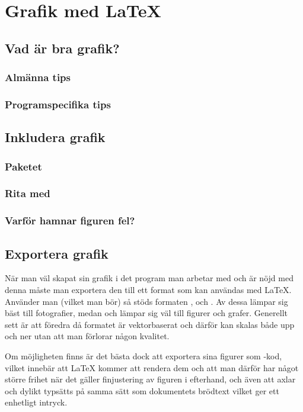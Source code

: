 \documentclass[../../latex.tex]{subfiles}
\begin{document}
\section{Grafik med \LaTeX}\label{sec:4}

\subsection{Vad är bra grafik?}
\subsubsection{Almänna tips}
\subsubsection{Programspecifika tips}
\label{sec:ggplot2}

\subsection{Inkludera grafik}
\subsubsection{Paketet }
\subsubsection{Rita med \PGFTikZ}
\subsubsection{Varför hamnar figuren fel?}

\subsection{Exportera grafik}
När man väl skapat sin grafik i det program man arbetar med och är nöjd
med denna måste man exportera den till ett format som kan användas med
\LaTeX. Använder man \pdfLaTeX (vilket man bör) så stöds formaten \JPEG,
\PNG och \PDF. Av dessa lämpar sig \JPEG bäst till fotografier, medan
\PNG och \PDF lämpar sig väl till figurer och grafer.
Generellt sett är \PDF att föredra då formatet är vektorbaserat och
därför kan skalas både upp och ner utan att man förlorar någon kvalitet.

Om möjligheten finns är det bästa dock att exportera sina figurer som
\PGFTikZ-kod, vilket innebär att \LaTeX{} kommer att rendera dem och att
man därför har något större frihet när det gäller finjustering av figuren
i efterhand, och även att axlar och dylikt typsätts på samma sätt som
dokumentets brödtext vilket ger ett enhetligt intryck.
\end{document}

